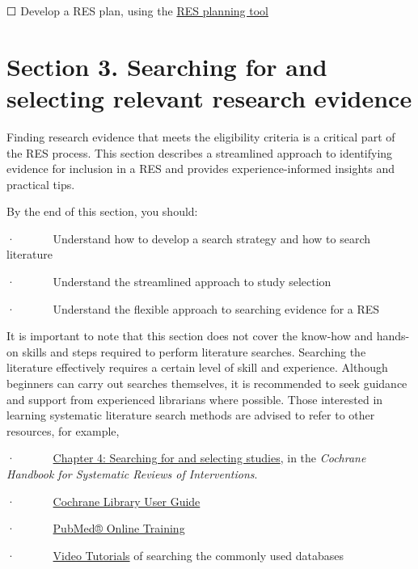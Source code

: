\documentclass[
  letterpaper,
  DIV=11,
  numbers=noendperiod]{scrreprt}
\begin{document}
☐ Develop a RES plan, using the
\href{https://livemanchesterac-my.sharepoint.com/personal/chunhu_shi_manchester_ac_uk/Documents/Documents/Research/Projects/RES/Admin/RES\%20planning\%20tool.docx}{RES
planning tool}\textbf{\hfill\break
}


\chapter{Section 3. Searching for and selecting relevant research
evidence}\label{section-3.-searching-for-and-selecting-relevant-research-evidence}

Finding research evidence that meets the eligibility criteria is a
critical part of the RES process. This section describes a streamlined
approach to identifying evidence for inclusion in a RES and provides
experience-informed insights and practical tips.

By the end of this section, you should:

·~~~~~~ Understand how to develop a search strategy and how to search
literature

·~~~~~~ Understand the streamlined approach to study selection

·~~~~~~ Understand the flexible approach to searching evidence for a RES

It is important to note that this section does not cover the know-how
and hands-on skills and steps required to perform literature searches.
Searching the literature effectively requires a certain level of skill
and experience. Although beginners can carry out searches themselves, it
is recommended to seek guidance and support from experienced librarians
where possible. Those interested in learning systematic literature
search methods are advised to refer to other resources, for example,

·~~~~~~
\href{https://training.cochrane.org/handbook/current/chapter-04}{Chapter
4: Searching for and selecting studies}, in the \emph{Cochrane Handbook
for Systematic Reviews of Interventions}.

·~~~~~~
\href{https://www.wiley.com/en-us/customer-success/cochrane/cochrane-library-user-guide}{Cochrane
Library User Guide}

·~~~~~~
\href{https://learn.nlm.nih.gov/documentation/training-packets/T0042010P/}{PubMed®
Online Training}

·~~~~~~ \href{https://hslmcmaster.libguides.com/tutorials}{Video
Tutorials} of searching the commonly used databases
\end{document}
